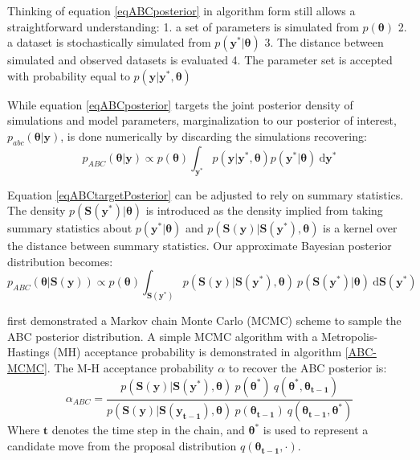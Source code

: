Thinking of equation \ref{eqABCposterior} in algorithm form still allows a straightforward understanding: 1. a set of parameters is simulated from $p(\bm{\theta})$ 2. a dataset is stochastically simulated from $p(\bm{y^*}|\bm{\theta})$ 3. The distance between simulated and observed datasets is evaluated 4. The parameter set is accepted with probability equal to $p(\bm{y}|\bm{y^*},\bm{\theta})$\par

While equation \ref{eqABCposterior} targets the joint posterior density of simulations and model parameters, marginalization to our posterior of interest, $p_{abc}(\bm{\theta}|\bm{y})$, is done numerically by discarding the simulations recovering:
\begin{equation}
p_{ABC}(\bm{\theta}|\bm{y}) \propto p(\bm{\theta}) \int_{\bm{y^*}} p(\bm{y}|\bm{y^*},\bm{\theta}) p(\bm{y^*}|\bm{\theta})\ \text{d}\bm{y^*}
\label{eqABCtargetPosterior}
\end{equation}\par

Equation \ref{eqABCtargetPosterior} can be adjusted to rely on summary statistics. The density $p(\bm{S}(\bm{y^*})|\bm{\theta})$ is introduced as the density implied from taking summary statistics about $p(\bm{y^*}|\bm{\theta})$ and $p(\bm{S}(\bm{y})|\bm{S}(\bm{y^*}),\bm{\theta})$ is a kernel over the distance between summary statistics. Our approximate Bayesian posterior distribution becomes:
\begin{equation}
p_{ABC}(\bm{\theta}|\bm{S}(\bm{y})) \propto p(\bm{\theta}) \int_{\bm{S}(\bm{y^*})} p(\bm{S}(\bm{y})|\bm{S}(\bm{y^*}),\bm{\theta})\  p(\bm{S}(\bm{y^*})|\bm{\theta})\ \text{d}\bm{S}(\bm{y^*})
\label{summary-stat-abc-posterior}
\end{equation}

\citet{Marjoram2003} first demonstrated a Markov chain Monte Carlo (MCMC) scheme to sample the ABC posterior distribution. A simple MCMC algorithm with a Metropolis-Hastings (MH) acceptance probability is demonstrated in algorithm \ref{ABC-MCMC}. The M-H acceptance probability $\alpha$ to recover the ABC posterior is:
\begin{equation}
\alpha_{ABC} = \frac{p(\bm{S}(\bm{y})|\bm{S}(\bm{y^*}),\bm{\theta})\ p(\bm{\theta^*})\ q(\bm{\theta^*},\bm{\theta_{t-1}})} {p(\bm{S}(\bm{y})|\bm{S}(\bm{y_{t-1}}),\bm{\theta})\ p(\bm{\theta_{t-1}})\ q(\bm{\theta_{t-1}},\bm{\theta^*})}
\label{M-H-acce}
\end{equation}
Where $\bm{t}$ denotes the time step in the chain, and $\bm{\theta^*}$ is used to represent a candidate move from the proposal distribution $q(\bm{\theta_{t-1}},\cdot)$.

